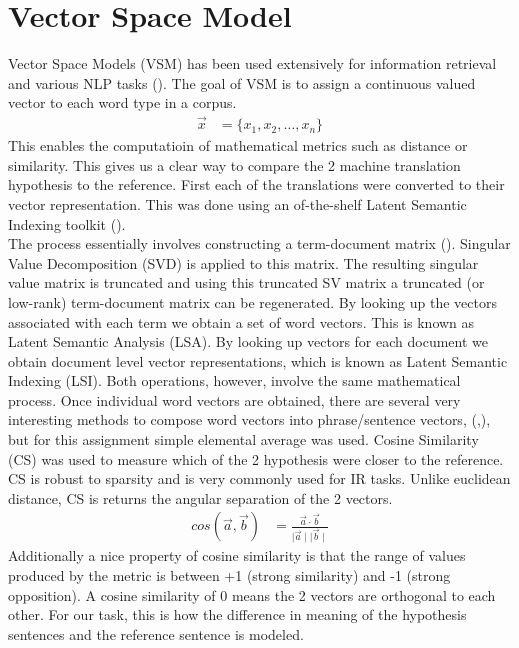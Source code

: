 \documentclass[11pt]{article}
\begin{document}
\section{Vector Space Model}
Vector Space Models (VSM) has been used extensively for information retrieval
and various NLP tasks (\cite{Manning:2008:IIR:1394399}). The goal of VSM is to
assign a continuous valued vector to each word type in a corpus.\\
\begin{align*}                                                                                                                                                                   
\vec{x} &= \{ x_1, x_2, \ldots, x_n\}
\end{align*}
 This enables the computatioin of mathematical metrics such as distance or
 similarity. This gives us a clear way to compare the 2 machine translation
 hypothesis to the reference. First each of the translations were converted to
 their vector representation. This was done using an of-the-shelf Latent
 Semantic Indexing toolkit (\cite{rehurek_lrec}).\\ The process essentially
 involves constructing a term-document matrix (\cite{turney2010frequency}).
 Singular Value Decomposition (SVD) is applied to this matrix. The resulting singular value matrix is
 truncated and using this truncated SV matrix a truncated (or low-rank)
 term-document matrix can be regenerated. By looking up the vectors associated
 with each term we obtain a set of word vectors. This is known as Latent
 Semantic Analysis (LSA). By looking up vectors for each document we obtain
 document level vector representations, which is known as Latent Semantic
 Indexing (LSI). Both operations, however, involve the same mathematical
 process. Once individual word vectors are obtained, there are several very
 interesting methods to compose word vectors into phrase/sentence vectors,
 (\cite{hermann2013role},\cite{socher2012semantic}), but for this assignment
 simple elemental average was used. Cosine Similarity (CS) was used to measure which of the 2 hypothesis were closer to the reference. CS is robust to sparsity and is very commonly used for IR tasks. Unlike euclidean distance, CS is returns the angular separation of the 2 vectors.
 \begin{align*}
 cos(\vec{a},\vec{b}) &= \frac{\vec{a}\cdot \vec{b}}{\mid\vec{a}\mid
 \mid\vec{b}\mid}
 \end{align*}
 Additionally a nice property of cosine similarity is that the range of values
 produced by the metric is between +1 (strong similarity) and -1 (strong
 opposition). A cosine similarity of 0 means the 2 vectors are orthogonal to
 each other. For our task, this is how the difference in meaning of the
 hypothesis sentences and the reference sentence is modeled.
\end{document}
